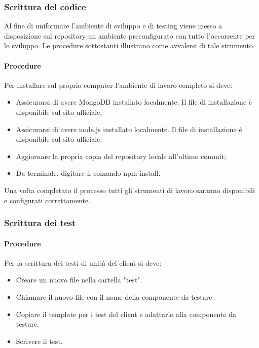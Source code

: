 \subsubsection{Scrittura del codice}
Al fine di uniformare l'ambiente di sviluppo e di testing viene messo a disposizione sul repository un ambiente preconfigurato con tutto l'occorrente per lo sviluppo.
Le procedure sottostanti illustrano come avvalersi di tale strumento.

\paragraph{Procedure}
Per installare sul proprio computer l'ambiente di lavoro completo si deve:

\begin{itemize}
\item Assicurarsi di avere MongoDB installato localmente. Il file di installazione è disponibile sul sito ufficiale;
\item Assicurarsi di avere node.js installato localmente.  Il file di installazione è disponibile sul sito ufficiale;
\item Aggiornare la propria copia del repository locale all'ultimo commit;
\item Da terminale, digitare il comando \glqq npm install\grqq.%
\end{itemize}

Una volta completato il processo tutti gli strumenti di lavoro saranno disponibili e configurati correttamente.


\subsubsection{Scrittura dei test}

\paragraph{Procedure}
Per la scrittura dei testi di unità del client si deve:

\begin{itemize}
\item Creare un nuovo file nella cartella "test".
\item Chiamare il nuovo file con il nome della componente da testare
\item Copiare il template per i test del client e adattarlo alla componente da testare.
\item Scrivere il test.
\end{itemize}



